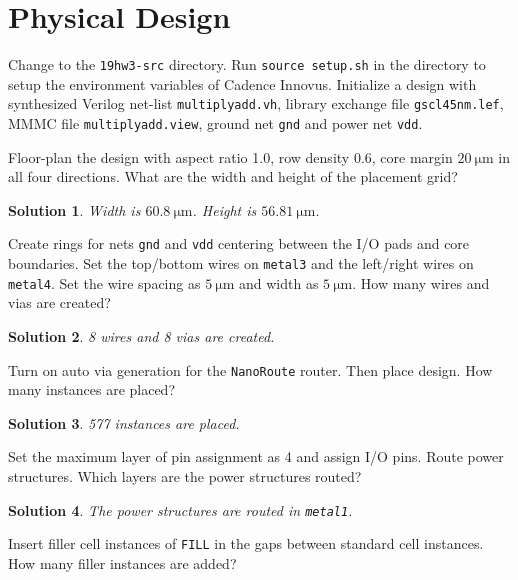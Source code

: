 \documentclass[acmlarge,screen=true,anonymous=false,11pt]{acmart}
\newtheorem*{solution*}{Solution}
\begin{document}
\section{Physical Design}
\label{sec:pd}
Change to the \texttt{19hw3-src} directory. Run \texttt{source setup.sh} in the directory to setup the environment variables of Cadence Innovus. Initialize a design with synthesized Verilog net-list \texttt{multiplyadd.vh}, library exchange file \texttt{gscl45nm.lef}, MMMC file \texttt{multiplyadd.view}, ground net \texttt{gnd} and power net \texttt{vdd}.
\begin{example}
    Floor-plan the design with aspect ratio 1.0, row density 0.6, core margin $20~\mathrm{\mu m}$ in all four directions. What are the width and height of the placement grid?
\end{example}
\begin{solution*}
    Width is $60.8~\mathrm{\mu m}$. Height is $56.81~\mathrm{\mu m}$.
\end{solution*}
\begin{example}
    Create rings for nets \texttt{gnd} and \texttt{vdd} centering between the I/O pads and core boundaries. Set the top/bottom wires on \texttt{metal3} and the left/right wires on \texttt{metal4}. Set the wire spacing as $5~\mathrm{\mu m}$ and width as $5~\mathrm{\mu m}$. How many wires and vias are created?
\end{example}
\begin{solution*}
    8 wires and 8 vias are created.
\end{solution*}
\begin{example}
    Turn on auto via generation for the \texttt{NanoRoute} router.
    Then place design. How many instances are placed?
\end{example}
\begin{solution*}
    577 instances are placed.
\end{solution*}
\begin{example}
    Set the maximum layer of pin assignment as 4 and assign I/O pins.
    Route power structures. Which layers are the power structures routed?
\end{example}
\begin{solution*}
    The power structures are routed in \texttt{metal1}.
\end{solution*}
\begin{example}
    Insert filler cell instances of \texttt{FILL} in the gaps between standard cell instances. How many filler instances are added?
\end{example}
\end{document}

